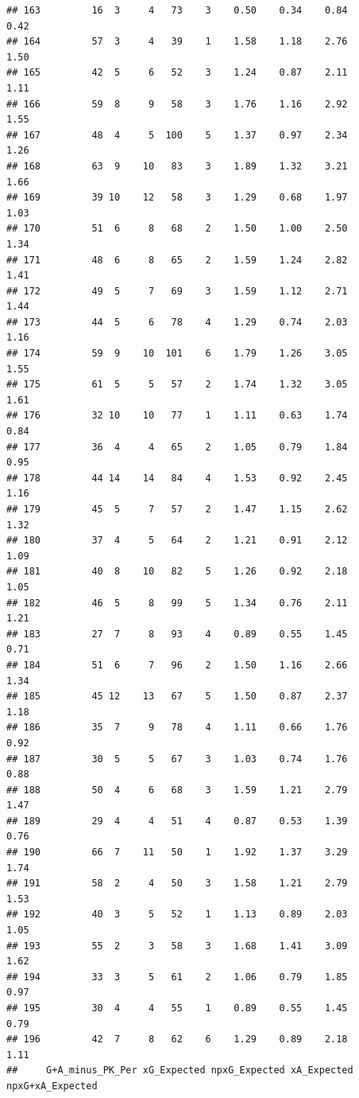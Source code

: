 \documentclass[
]{book}
\theoremstyle{definition}
\theoremstyle{definition}
\theoremstyle{definition}
\theoremstyle{definition}
\theoremstyle{remark}
\begin{document}
\begin{verbatim}
## 163         16  3     4   73    3    0.50    0.34    0.84           0.42
## 164         57  3     4   39    1    1.58    1.18    2.76           1.50
## 165         42  5     6   52    3    1.24    0.87    2.11           1.11
## 166         59  8     9   58    3    1.76    1.16    2.92           1.55
## 167         48  4     5  100    5    1.37    0.97    2.34           1.26
## 168         63  9    10   83    3    1.89    1.32    3.21           1.66
## 169         39 10    12   58    3    1.29    0.68    1.97           1.03
## 170         51  6     8   68    2    1.50    1.00    2.50           1.34
## 171         48  6     8   65    2    1.59    1.24    2.82           1.41
## 172         49  5     7   69    3    1.59    1.12    2.71           1.44
## 173         44  5     6   78    4    1.29    0.74    2.03           1.16
## 174         59  9    10  101    6    1.79    1.26    3.05           1.55
## 175         61  5     5   57    2    1.74    1.32    3.05           1.61
## 176         32 10    10   77    1    1.11    0.63    1.74           0.84
## 177         36  4     4   65    2    1.05    0.79    1.84           0.95
## 178         44 14    14   84    4    1.53    0.92    2.45           1.16
## 179         45  5     7   57    2    1.47    1.15    2.62           1.32
## 180         37  4     5   64    2    1.21    0.91    2.12           1.09
## 181         40  8    10   82    5    1.26    0.92    2.18           1.05
## 182         46  5     8   99    5    1.34    0.76    2.11           1.21
## 183         27  7     8   93    4    0.89    0.55    1.45           0.71
## 184         51  6     7   96    2    1.50    1.16    2.66           1.34
## 185         45 12    13   67    5    1.50    0.87    2.37           1.18
## 186         35  7     9   78    4    1.11    0.66    1.76           0.92
## 187         30  5     5   67    3    1.03    0.74    1.76           0.88
## 188         50  4     6   68    3    1.59    1.21    2.79           1.47
## 189         29  4     4   51    4    0.87    0.53    1.39           0.76
## 190         66  7    11   50    1    1.92    1.37    3.29           1.74
## 191         58  2     4   50    3    1.58    1.21    2.79           1.53
## 192         40  3     5   52    1    1.13    0.89    2.03           1.05
## 193         55  2     3   58    3    1.68    1.41    3.09           1.62
## 194         33  3     5   61    2    1.06    0.79    1.85           0.97
## 195         30  4     4   55    1    0.89    0.55    1.45           0.79
## 196         42  7     8   62    6    1.29    0.89    2.18           1.11
##     G+A_minus_PK_Per xG_Expected npxG_Expected xA_Expected npxG+xA_Expected

\end{verbatim}
\end{document}
